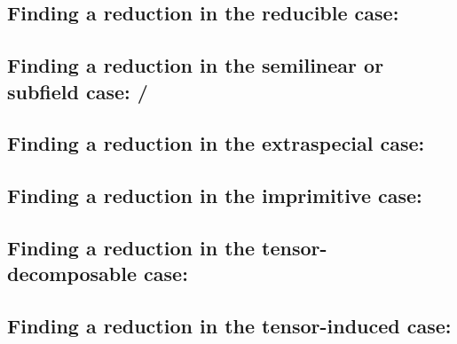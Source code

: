 \subsection{Finding a reduction in the reducible case: }
\label{solveC1}

\subsection{Finding a reduction in the semilinear or subfield case: /}
\label{solveC3C5}

\subsection{Finding a reduction in the extraspecial case: }
\label{solveC6}

\subsection{Finding a reduction in the imprimitive case: }
\label{solveC2}

\subsection{Finding a reduction in the tensor-decomposable case: }
\label{solveC4}

\subsection{Finding a reduction in the tensor-induced case: }
\label{solveC7}




